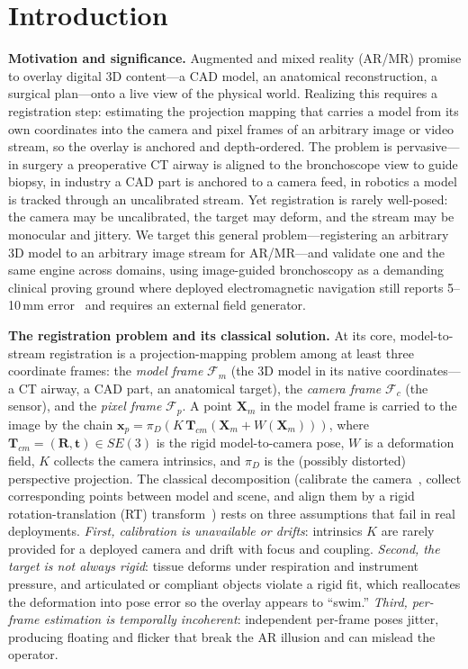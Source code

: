 \documentclass[9pt,twoside,web]{ieeecolor2}
\begin{document}
\section{Introduction}\label{sec:intro}

\textbf{Motivation and significance.} Augmented and mixed reality (AR/MR) promise to overlay digital 3D content---a CAD model, an anatomical reconstruction, a surgical plan---onto a live view of the physical world. Realizing this requires a registration step: estimating the projection mapping that carries a model from its own coordinates into the camera and pixel frames of an arbitrary image or video stream, so the overlay is anchored and depth-ordered. The problem is pervasive---in surgery a preoperative CT airway is aligned to the bronchoscope view to guide biopsy, in industry a CAD part is anchored to a camera feed, in robotics a model is tracked through an uncalibrated stream. Yet registration is rarely well-posed: the camera may be uncalibrated, the target may deform, and the stream may be monocular and jittery. We target this general problem---registering an arbitrary 3D model to an arbitrary image stream for AR/MR---and validate one and the same engine across domains, using image-guided bronchoscopy as a demanding clinical proving ground where deployed electromagnetic navigation still reports 5--10\,mm error~\cite{gildea2006enb} and requires an external field generator.

\textbf{The registration problem and its classical solution.} At its core, model-to-stream registration is a projection-mapping problem among at least three coordinate frames: the \emph{model frame} $\mathcal{F}_{m}$ (the 3D model in its native coordinates---a CT airway, a CAD part, an anatomical target), the \emph{camera frame} $\mathcal{F}_{c}$ (the sensor), and the \emph{pixel frame} $\mathcal{F}_{p}$. A point $\mathbf{X}_{m}$ in the model frame is carried to the image by the chain $\mathbf{x}_{p}=\pi_{D}(K\,\mathbf{T}_{cm}(\mathbf{X}_{m}+W(\mathbf{X}_{m})))$, where $\mathbf{T}_{cm}=(\mathbf{R},\mathbf{t})\in SE(3)$ is the rigid model-to-camera pose, $W$ is a deformation field, $K$ collects the camera intrinsics, and $\pi_{D}$ is the (possibly distorted) perspective projection. The classical decomposition (calibrate the camera~\cite{zhang2000calibration}, collect corresponding points between model and scene, and align them by a rigid rotation-translation (RT) transform~\cite{kabsch1976,umeyama1991,besl1992icp}) rests on three assumptions that fail in real deployments. \emph{First, calibration is unavailable or drifts}: intrinsics $K$ are rarely provided for a deployed camera and drift with focus and coupling. \emph{Second, the target is not always rigid}: tissue deforms under respiration and instrument pressure, and articulated or compliant objects violate a rigid fit, which reallocates the deformation into pose error so the overlay appears to ``swim.'' \emph{Third, per-frame estimation is temporally incoherent}: independent per-frame poses jitter, producing floating and flicker that break the AR illusion and can mislead the operator.
\end{document}
